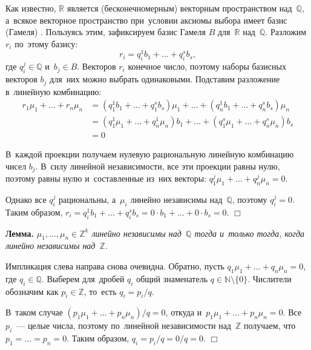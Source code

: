 \documentclass[twoside]{article}
\begin{document}
    Как известно, $\mathbb{R}$ является (бесконечномерным) векторным пространством над~$\mathbb{Q}$, а~всякое векторное пространство
    при~условии аксиомы выбора имеет базис (Гамеля) \cite{Brbk70}. Пользуясь этим, зафиксируем базис Гамеля $B$ для~$\mathbb{R}$ над~$\mathbb{Q}$.
    Разложим $r_i$ по~этому базису:
    $$
        r_i = q_i^1 b_1 + \ldots + q_i^s b_s,
    $$
    где $q_i^j \in \mathbb{Q}$ и~$b_j \in B$. Векторов $r_i$ конечное число, поэтому наборы базисных векторов $b_j$ для~них можно выбрать одинаковыми.
    Подставим разложение в~линейную комбинацию:
    \begin{align*}
        r_1 \mu_1 + \ldots + r_n \mu_n & = (q_1^1 b_1 + \ldots + q_1^s b_s) \mu_1 + \ldots + (q_n^1 b_1 + \ldots + q_n^s b_s) \mu_n \\
                                       & = (q_1^1 \mu_1 + \ldots + q_n^1 \mu_n) b_1 + \ldots + (q_1^s \mu_1 + \ldots + q_n^s \mu_n) b_s \\
                                       & = 0
    \end{align*}

    В~каждой проекции получаем нулевую рациональную линейную комбинацию чисел $b_j$. В~силу линейной независимости,
    все эти проекции равны нулю, поэтому равны нулю и~составленные из~них векторы: $q_1^j \mu_1 + \ldots + q_n^j \mu_n = 0$.

    Однако все $q_i^j$ рациональны, а~$\mu_i$ линейно независимы над~$\mathbb{Q}$, поэтому $q_i^j = 0$.
    Таким образом, $r_i = q_i^1 b_1 + \ldots + q_i^s b_s = 0 \cdot b_1 + \ldots + 0 \cdot b_s = 0$.
\hfill$\Box$\medskip

\medskip\noindent\textbf{Лемма.}\emph{
    $\mu_1, \ldots, \mu_n \in \mathbb{Z}^k$ линейно независимы над~$\mathbb{Q}$ тогда и~только тогда, когда линейно независимы над~$\mathbb{Z}$.
}\medskip

    Импликация слева направа снова очевидна. Обратно, пусть $q_1 \mu_1 + \ldots + q_n \mu_n = 0$, где $q_i \in \mathbb{Q}$.
    Выберем для~дробей $q_i$ общий знаменатель $q \in \mathbb{N} \setminus \{ 0 \}$. Числители обозначим как $p_i \in \mathbb{Z}$, то~есть $q_i = p_i / q$.

    В~таком случае $(p_1 \mu_1 + \ldots + p_n \mu_n) / q = 0$, откуда и~$p_1 \mu_1 + \ldots + p_n \mu_n = 0$.
    Все $p_i$~— целые числа, поэтому по~линейной независимости над~$\mathbb{Z}$ получаем, что $p_1 = \ldots = p_n = 0$.
    Таким образом, $q_i = p_i / q = 0 / q = 0$.
\hfill$\Box$\medskip
\end{document}
